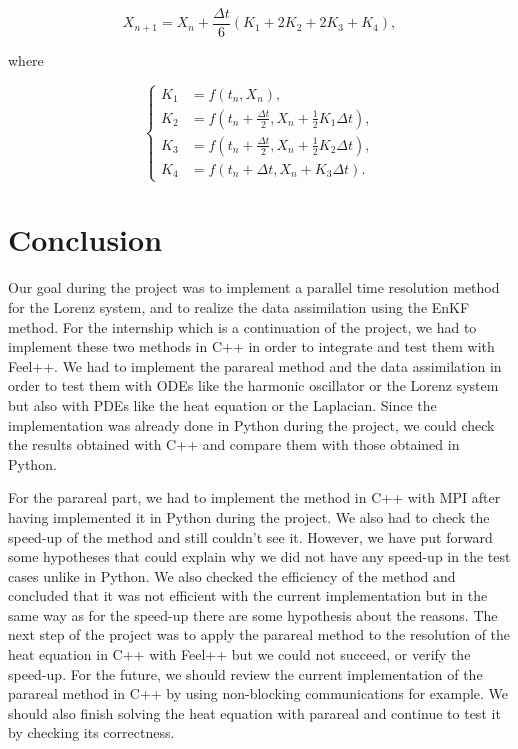 \documentclass[12pt]{article}
\begin{document}
		$$X_{n+1}=X_n+\frac{\Delta t}{6}\left(K_1+2K_2+2K_3+K_4\right) ,$$
		
		\noindent where 
		
		$$\left\{\begin{aligned}
			K_1&=f(t_n,X_n) , \\
			K_2&=f\left(t_n+\frac{\Delta t}{2},X_n+\frac{1}{2} K_1\Delta t\right) , \\
			K_3&=f\left(t_n+\frac{\Delta t}{2},X_n+\frac{1}{2} K_2\Delta t\right) , \\
			K_4&=f\left(t_n+\Delta t,X_n+K_3\Delta t\right) .
		\end{aligned}\right.$$
	
    

	
	\newpage
	
	
	
	\newpage
	
		

	\newpage

	\section{Conclusion}
	\noindent Our goal during the project was to implement a parallel time resolution method for the Lorenz system, and to realize the data assimilation using the EnKF method.
	For the internship which is a continuation of the project, we had to implement these two methods in C++ in order to integrate and test them with Feel++.
	\noindent We had to implement the parareal method and the data assimilation in order to test them with ODEs like the harmonic oscillator or the Lorenz system but also with PDEs like the heat equation or the Laplacian. Since the implementation was already done in Python during the project, we could check the results obtained with C++ and compare them with those obtained in Python.
	
	\noindent For the parareal part, we had to implement the method in C++ with MPI after having implemented it in Python during the project. We also had to check the speed-up of the method and still couldn't see it. However, we have put forward some hypotheses that could explain why we did not have any speed-up in the test cases unlike in Python. We also checked the efficiency of the method and concluded that it was not efficient with the current implementation but in the same way as for the speed-up there are some hypothesis about the reasons. The next step of the project was to apply the parareal method to the resolution of the heat equation in C++ with Feel++ but we could not succeed, or verify the speed-up. For the future, we should review the current implementation of the parareal method in C++ by using non-blocking communications for example. We should also finish solving the heat equation with parareal and continue to test it by checking its correctness.
	
\end{document}
